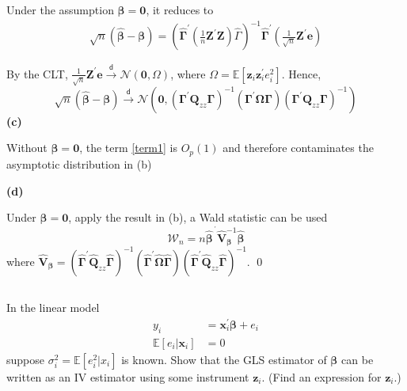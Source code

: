 \documentclass[12pt, a4paper,oneside,leqno]{article}
\renewenvironment{proof}{\noindent{ Proof.}\hspace*{1em}}{\qed\vspace{1em}\\}
\begin{document}
\begin{spacing}{1.3}
{\begin{shaded}
\begin{proof}
Under the assumption $\bm{\beta} = \bm{0}  $, it reduces to 
\begin{align*}
  \sqrt{n}\left( \widehat{\bm{\beta} } - \bm{\beta}   \right) =  \left( \widehat{\bm{\Gamma} }^\prime \left( \frac{1}{n}\bm{Z}^\prime\bm{Z}   \right)\widehat{\Gamma}   \right)^{-1} \widehat{\bm{\Gamma} }^\prime \left( \frac{1}{\sqrt{n} } \bm{Z}^\prime \bm{e}  \right) 
\end{align*}

By the CLT, $\frac{1}{\sqrt{n} } \bm{Z}^\prime \bm{e} \stackrel{\mathsf{d}}{\longrightarrow} \mathscr{N}\left( \bm{0}, \Omega  \right)   $, where $\Omega = \mathbb{E}[\bm{z}_{i}\bm{z}_{i}^\prime e_{i}^2  ].$ Hence,\[
  \sqrt{n}\left( \widehat{\bm{\beta} } - \bm{\beta}   \right) \stackrel{\mathsf{d}}{\longrightarrow} \mathscr{N}\left( \bm{0}, \left( \bm{\Gamma}^\prime \bm{Q}_{zz} \bm{\Gamma}    \right)^{-1} \left( \bm{\Gamma}^\prime \bm{\Omega} \bm{\Gamma}    \right) \left( \bm{\Gamma}^\prime \bm{Q}_{zz} \bm{\Gamma}    \right)^{-1}  \right)  
\]
\textbf{(c)}

Without $\bm{\beta} = \bm{0}  $, the term \cref{term1} is $O_{p}(1)$ and therefore contaminates the asymptotic distribution in (b)

\textbf{(d)}

Under $\bm{\beta} = \bm{0}  $, apply the result in (b), a Wald statistic can be used \[
  \mathcal{W}_{n} = n  \widehat{\bm{\beta} } ^{\,^\prime}  \widehat{\bm{V} }_{\bm{\beta} }^{-1} \widehat{\bm{\beta} }      
\]
where $\widehat{\bm{V} }_{\bm{\beta} } = \left( \widehat{\bm{\Gamma} }^\prime \widehat{\bm{Q} }_{zz} \widehat{\bm{\Gamma} }    \right)^{-1} \left( \widehat{\bm{\Gamma} }^\prime \widehat{\bm{\Omega} } \widehat{\bm{\Gamma} }    \right)\left( \widehat{\bm{\Gamma} }^\prime \widehat{\bm{Q} }_{zz} \widehat{\bm{\Gamma} }    \right)^{-1}. $
     \end{proof}\vspace{-1.5em}
\end{shaded}}


{\begin{shaded}\vspace{-2em}
    \section*{\large {}}   \vspace{-1.5em}
In the linear model 
\begin{align*}
y_{i} &= \bm{x}_{i}^\prime \bm{\beta} + e_{i} \\
\mathbb{E}[e_{i} | \bm{x}_{i} ] &= 0
\end{align*}
suppose $\sigma_{i}^2 = \mathbb{E}[e_{i}^2 | x_{i}]$ is known. Show that the GLS estimator of $\bm{\beta} $ can be written as an IV estimator using some instrument $\bm{z}_{i} $. (Find an expression for $\bm{z}_{i} $.)
\end{shaded}}


\end{spacing}
\end{document}
